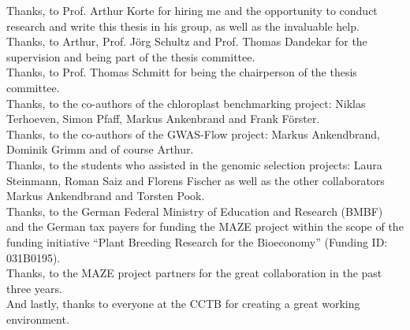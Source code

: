 \documentclass[
12pt, %
english, %
doublespacing, %
headsepline, %
chapterinoneline, %
]{MastersDoctoralThesis} %
\begin{document}

\begin{acknowledgements}
   \noindent
   Thanks, to Prof. Arthur Korte for hiring me and the opportunity to conduct research and write this thesis in his group, as well as the invaluable help. \\
   Thanks, to Arthur, Prof. Jörg Schultz and Prof. Thomas Dandekar for the supervision and being part of the thesis committee. \\
   Thanks, to Prof. Thomas Schmitt for being the chairperson of the thesis committee. \\
   Thanks, to the co-authors of the chloroplast benchmarking project: Niklas Terhoeven, Simon Pfaff, Markus Ankenbrand and Frank Förster. \\
   Thanks, to the co-authors of the GWAS-Flow project: Markus Ankendbrand, Dominik Grimm and of course Arthur. \\
   Thanks, to the students who assisted in the genomic selection projects: Laura Steinmann, Roman Saiz and Florens Fischer as well as the other collaborators Markus Ankendbrand and Torsten Pook. \\
   Thanks, to the German Federal Ministry of Education and Research (BMBF) and the German
   tax payers for funding the MAZE project within the scope of the funding initiative
   “Plant Breeding Research for the Bioeconomy” (Funding ID: 031B0195). \\
   Thanks, to the MAZE project partners for the great collaboration in the past three years. \\
   And lastly, thanks to everyone at the CCTB for creating a great working environment. \\
\end{acknowledgements}
\end{document}
